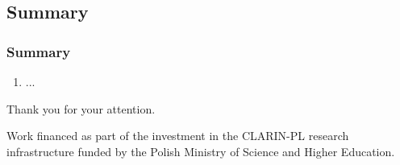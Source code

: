 \documentclass[Warsaw]{beamer}
\begin{document}
\subsection{Summary}
\begin{frame}
  \frametitle{Summary}
  \begin{enumerate}
  	\item ...
  \end{enumerate}  
\end{frame} 


\begin{frame}
    \centering
    \vspace{6em}
    
    Thank you for your attention.
    
    \vspace{6em}
    
    \scriptsize
    \begin{center}
    Work financed as part of the investment in the CLARIN-PL research infrastructure funded by the Polish Ministry of Science and Higher Education.
    \end{center}
\end{frame}
  

\begin{frame}
\tiny


\end{frame}  

  
\end{document}
